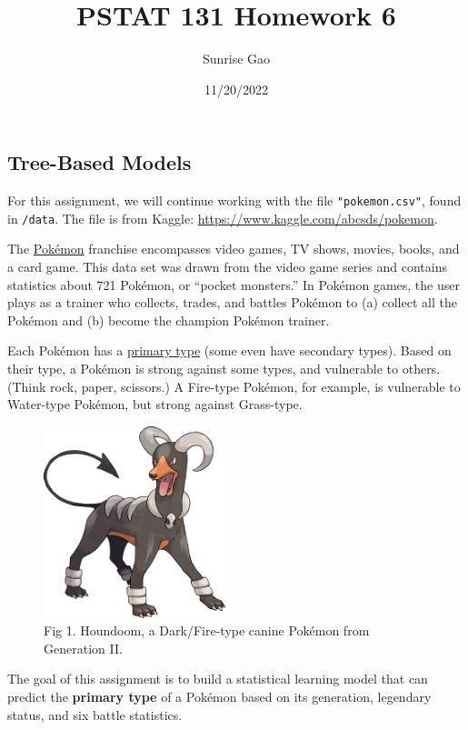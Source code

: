 \documentclass[
]{article}
\title{PSTAT 131 Homework 6}
\author{Sunrise Gao}
\date{11/20/2022}
\begin{document}
\maketitle

{
\setcounter{tocdepth}{2}
\tableofcontents
}
\hypertarget{tree-based-models}{%
\subsection{Tree-Based Models}\label{tree-based-models}}

For this assignment, we will continue working with the file
\texttt{"pokemon.csv"}, found in \texttt{/data}. The file is from
Kaggle: \url{https://www.kaggle.com/abcsds/pokemon}.

The \href{https://www.pokemon.com/us/}{Pokémon} franchise encompasses
video games, TV shows, movies, books, and a card game. This data set was
drawn from the video game series and contains statistics about 721
Pokémon, or ``pocket monsters.'' In Pokémon games, the user plays as a
trainer who collects, trades, and battles Pokémon to (a) collect all the
Pokémon and (b) become the champion Pokémon trainer.

Each Pokémon has a
\href{https://bulbapedia.bulbagarden.net/wiki/Type}{primary type} (some
even have secondary types). Based on their type, a Pokémon is strong
against some types, and vulnerable to others. (Think rock, paper,
scissors.) A Fire-type Pokémon, for example, is vulnerable to Water-type
Pokémon, but strong against Grass-type.

\begin{figure}
\centering
\includegraphics[width=2.08333in,height=\textheight]{images/houndoom.jpg}
\caption{Fig 1. Houndoom, a Dark/Fire-type canine Pokémon from
Generation II.}
\end{figure}

The goal of this assignment is to build a statistical learning model
that can predict the \textbf{primary type} of a Pokémon based on its
generation, legendary status, and six battle statistics.
\end{document}
